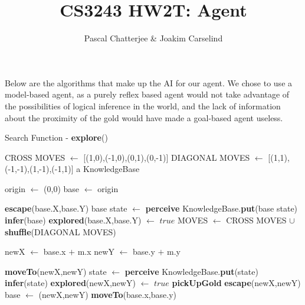 \documentclass[11pt,a4paper]{article}
\author{Pascal Chatterjee & Joakim Carselind}
\title{CS3243 HW2T: Agent}
\begin{document}
 

Below are the algorithms that make up the AI for our agent. We chose to use a model-based agent, as a purely reflex based agent would not take advantage of the possibilities of logical inference in the world, and the lack of information about the proximity of the gold would have made a goal-based agent useless.

\listofalgorithms 

\begin{algorithm}
\caption{Search Function - \textbf{explore}()}
\label{explore}
\begin{algorithmic}[1]
\REQUIRE CROSS MOVES $\leftarrow$ [(1,0),(-1,0),(0,1),(0,-1)]
\REQUIRE DIAGONAL MOVES $\leftarrow$ [(1,1),(-1,-1),(1,-1),(-1,1)]
\REQUIRE a KnowledgeBase

\STATE origin $\leftarrow$ (0,0)
\STATE base $\leftarrow$ origin

\LOOP
{}
\STATE \textbf{escape}(base.X,base.Y)
\ELSE 
\STATE base state $\leftarrow$ \textbf{perceive}
\STATE KnowledgeBase.\textbf{put}(base state)
\STATE \textbf{infer}(base)
\STATE \textbf{explored}(base.X,base.Y) $\leftarrow$ $true$
\STATE 
\STATE MOVES $\leftarrow$ CROSS MOVES $\cup$ \textbf{shuffle}(DIAGONAL MOVES)

\STATE newX $\leftarrow$ base.x $+$ m.x 
\STATE newY $\leftarrow$ base.y $+$ m.y

\STATE \textbf{moveTo}(newX,newY)
\STATE state $\leftarrow$ \textbf{perceive}
\STATE KnowledgeBase.\textbf{put}(state)
\STATE \textbf{infer}(state)
\STATE \textbf{explored}(newX,newY) $\leftarrow$ $true$
\STATE \textbf{pickUpGold}
\STATE \textbf{escape}(newX,newY)
\ENDIF
{}
\STATE base $\leftarrow$ (newX,newY)
\ELSE
\STATE \textbf{moveTo}(base.x,base.y)
\ENDIF
\ENDIF

\ENDFOR
\ENDIF
\ENDLOOP
\end{algorithmic}
\end{algorithm}

\newpage
\end{document}
